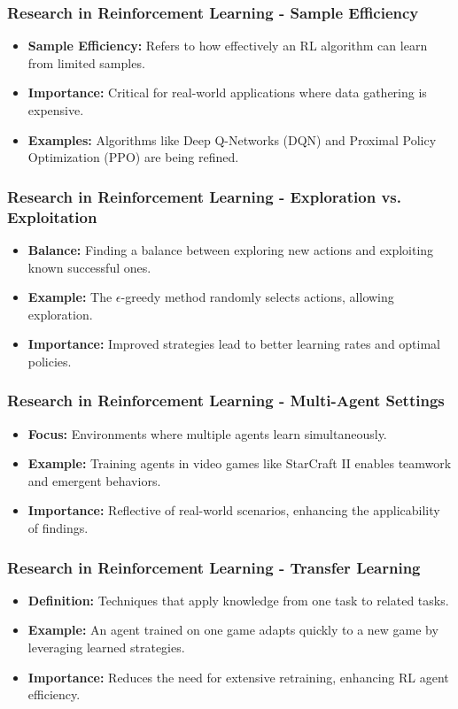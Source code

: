 \documentclass[aspectratio=169]{beamer}
\begin{document}
\begin{frame}[fragile]
    \frametitle{Research in Reinforcement Learning - Sample Efficiency}
    \begin{itemize}
        \item \textbf{Sample Efficiency:} Refers to how effectively an RL algorithm can learn from limited samples.
        \item \textbf{Importance:} Critical for real-world applications where data gathering is expensive.
        \item \textbf{Examples:} Algorithms like Deep Q-Networks (DQN) and Proximal Policy Optimization (PPO) are being refined.
    \end{itemize}
\end{frame}

\begin{frame}[fragile]
    \frametitle{Research in Reinforcement Learning - Exploration vs. Exploitation}
    \begin{itemize}
        \item \textbf{Balance:} Finding a balance between exploring new actions and exploiting known successful ones.
        \item \textbf{Example:} The $\epsilon$-greedy method randomly selects actions, allowing exploration.
        \item \textbf{Importance:} Improved strategies lead to better learning rates and optimal policies.
    \end{itemize}
\end{frame}

\begin{frame}[fragile]
    \frametitle{Research in Reinforcement Learning - Multi-Agent Settings}
    \begin{itemize}
        \item \textbf{Focus:} Environments where multiple agents learn simultaneously.
        \item \textbf{Example:} Training agents in video games like StarCraft II enables teamwork and emergent behaviors.
        \item \textbf{Importance:} Reflective of real-world scenarios, enhancing the applicability of findings.
    \end{itemize}
\end{frame}

\begin{frame}[fragile]
    \frametitle{Research in Reinforcement Learning - Transfer Learning}
    \begin{itemize}
        \item \textbf{Definition:} Techniques that apply knowledge from one task to related tasks.
        \item \textbf{Example:} An agent trained on one game adapts quickly to a new game by leveraging learned strategies.
        \item \textbf{Importance:} Reduces the need for extensive retraining, enhancing RL agent efficiency.
    \end{itemize}
\end{frame}
\end{document}

